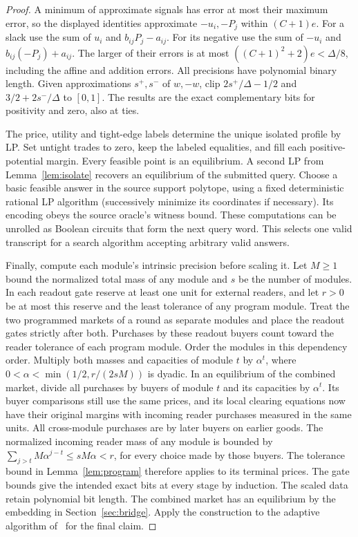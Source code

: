 \documentclass[11pt]{article}
\begin{document}
\begin{proof}
A minimum of approximate signals has error at most their maximum error,
so the displayed identities approximate \(-u_i,-P_j\) within
\((C+1)e\). For a slack use the sum of \(u_i\) and \(b_{ij}P_j-a_{ij}\).
For its negative use the sum of \(-u_i\) and \(b_{ij}(-P_j)+a_{ij}\).
The larger of their errors is at most \(((C+1)^2+2)e<\Delta/8\), including
the affine and addition errors. All precisions have polynomial binary length.
Given approximations
\(s^+,s^-\) of \(w,-w\), clip \(2s^+/\Delta-1/2\) and
\(3/2+2s^-/\Delta\) to \([0,1]\). The results are the exact complementary
bits for positivity and zero, also at ties.

The price, utility and tight-edge labels determine the unique isolated
profile by LP. Set untight trades to zero, keep the labeled equalities,
and fill each positive-potential margin. Every feasible point is an
equilibrium. A second LP from Lemma~\ref{lem:isolate} recovers an
equilibrium of the submitted query. Choose a basic feasible answer
in the source support polytope, using a fixed deterministic rational LP
algorithm (successively minimize its coordinates if necessary). Its
encoding obeys the source oracle's witness bound. These computations can be unrolled
as Boolean circuits that form the next query word. This selects one valid
transcript for a search algorithm accepting arbitrary valid answers.

Finally, compute each module's intrinsic precision before scaling it.
Let \(M\ge1\) bound the normalized total mass of any module and \(s\)
be the number of modules. In each readout gate reserve at least one
unit for external readers, and let \(r>0\) be at most this reserve and
the least tolerance of any program module. Treat the two programmed
markets of a round as separate modules and place the readout gates
strictly after both. Purchases by these readout buyers count toward the reader tolerance of
each program module. Order the modules in this dependency order.
Multiply both masses and capacities of module \(t\) by \(\alpha^t\),
where \(0<\alpha<\min(1/2,r/(2sM))\) is dyadic. In an equilibrium
of the combined market, divide all purchases by buyers of module \(t\)
and its capacities by \(\alpha^t\). Its buyer comparisons still use the
same prices, and its local clearing equations now have their original
margins with incoming reader purchases measured in the same units. All
cross-module purchases are by later buyers on earlier goods. The normalized
incoming reader mass of any module is bounded by
\(\sum_{j>t}M\alpha^{j-t}\le sM\alpha<r\), for every choice made by
those buyers. The tolerance bound in Lemma~\ref{lem:program} therefore
applies to its terminal prices. The gate bounds give the intended exact
bits at every stage by induction. The scaled data retain
polynomial bit length. The combined market has an equilibrium by the
embedding in Section~\ref{sec:bridge}. Apply the construction to the
adaptive algorithm of~\cite[Theorem~3.1]{book} for the final claim.
\end{proof}
\end{document}

